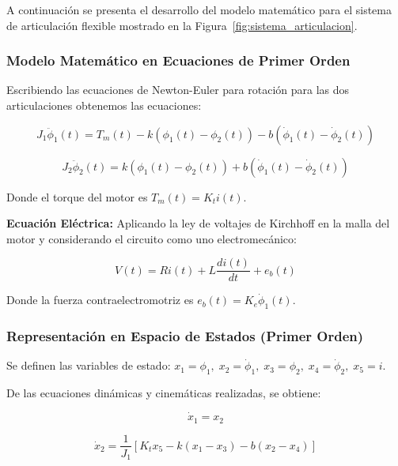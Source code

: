 \documentclass[conference]{IEEEtran}
\begin{document}
A continuación se presenta el desarrollo del modelo matemático para el sistema de articulación flexible mostrado en la Figura~\ref{fig:sistema_articulacion}.

\subsubsection{Modelo Matemático en Ecuaciones de Primer Orden}

Escribiendo las ecuaciones de Newton-Euler para rotación para las dos articulaciones obtenemos las ecuaciones:

\begin{equation}
J_1\ddot{\phi}_1(t) = T_m(t) - k(\phi_1(t) - \phi_2(t)) - b(\dot{\phi}_1(t) - \dot{\phi}_2(t))
\end{equation}

\begin{equation}
J_2\ddot{\phi}_2(t) = k(\phi_1(t) - \phi_2(t)) + b(\dot{\phi}_1(t) - \dot{\phi}_2(t))
\end{equation}

Donde el torque del motor es $T_m(t) = K_t i(t)$.

\textbf{Ecuación Eléctrica:} Aplicando la ley de voltajes de Kirchhoff en la malla del motor y considerando el circuito como uno electromecánico:

\begin{equation}
V(t) = Ri(t) + L\frac{di(t)}{dt} + e_b(t)
\end{equation}

Donde la fuerza contraelectromotriz es $e_b(t) = K_e\dot{\phi}_1(t)$.

\subsubsection{Representación en Espacio de Estados (Primer Orden)}

Se definen las variables de estado: $x_1 = \phi_1, \; x_2 = \dot{\phi}_1, \; x_3 = \phi_2, \; x_4 = \dot{\phi}_2, \; x_5 = i$.

De las ecuaciones dinámicas y cinemáticas realizadas, se obtiene:

\begin{equation}
\dot{x}_1 = x_2
\end{equation}

\begin{equation}
\dot{x}_2 = \frac{1}{J_1}[K_t x_5 - k(x_1 - x_3) - b(x_2 - x_4)]
\end{equation}
\end{document}
